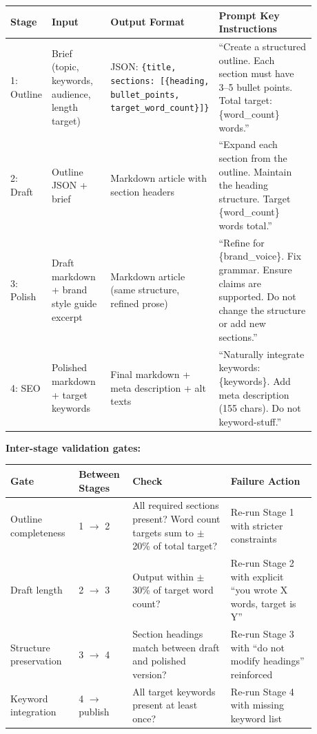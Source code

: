 \begin{tabular}{|p{0.08\linewidth}|p{0.20\linewidth}|p{0.25\linewidth}|p{0.35\linewidth}|}
\hline
\textbf{Stage} & \textbf{Input} & \textbf{Output Format} & \textbf{Prompt Key Instructions} \\
\hline
1: Outline & Brief (topic, keywords, audience, length target) & JSON: \texttt{\{title, sections: [\{heading, bullet\_points, target\_word\_count\}]\}} & ``Create a structured outline. Each section must have 3--5 bullet points. Total target: \{word\_count\} words.'' \\
\hline
2: Draft & Outline JSON + brief & Markdown article with section headers & ``Expand each section from the outline. Maintain the heading structure. Target \{word\_count\} words total.'' \\
\hline
3: Polish & Draft markdown + brand style guide excerpt & Markdown article (same structure, refined prose) & ``Refine for \{brand\_voice\}. Fix grammar. Ensure claims are supported. Do not change the structure or add new sections.'' \\
\hline
4: SEO & Polished markdown + target keywords & Final markdown + meta description + alt texts & ``Naturally integrate keywords: \{keywords\}. Add meta description (155 chars). Do not keyword-stuff.'' \\
\hline
\end{tabular}

\textbf{Inter-stage validation gates:}

\begin{tabular}{|p{0.18\linewidth}|p{0.14\linewidth}|p{0.30\linewidth}|p{0.26\linewidth}|}
\hline
\textbf{Gate} & \textbf{Between Stages} & \textbf{Check} & \textbf{Failure Action} \\
\hline
Outline completeness & 1 $\rightarrow$ 2 & All required sections present? Word count targets sum to $\pm$20\% of total target? & Re-run Stage 1 with stricter constraints \\
\hline
Draft length & 2 $\rightarrow$ 3 & Output within $\pm$30\% of target word count? & Re-run Stage 2 with explicit ``you wrote X words, target is Y'' \\
\hline
Structure preservation & 3 $\rightarrow$ 4 & Section headings match between draft and polished version? & Re-run Stage 3 with ``do not modify headings'' reinforced \\
\hline
Keyword integration & 4 $\rightarrow$ publish & All target keywords present at least once? & Re-run Stage 4 with missing keyword list \\
\hline
\end{tabular}

